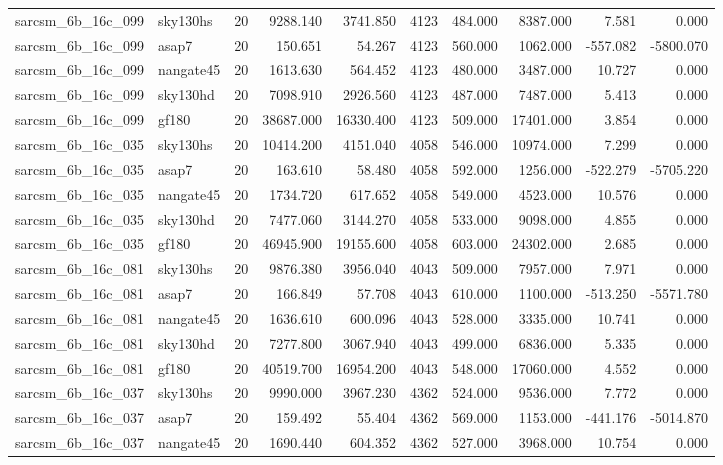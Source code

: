 \begin{longtable}{llrrrrrrrr}
sarcsm\_6b\_16c\_099 & sky130hs & 20 & 9288.140 & 3741.850 & 4123 & 484.000 & 8387.000 & 7.581 & 0.000 \\
sarcsm\_6b\_16c\_099 & asap7 & 20 & 150.651 & 54.267 & 4123 & 560.000 & 1062.000 & -557.082 & -5800.070 \\
sarcsm\_6b\_16c\_099 & nangate45 & 20 & 1613.630 & 564.452 & 4123 & 480.000 & 3487.000 & 10.727 & 0.000 \\
sarcsm\_6b\_16c\_099 & sky130hd & 20 & 7098.910 & 2926.560 & 4123 & 487.000 & 7487.000 & 5.413 & 0.000 \\
sarcsm\_6b\_16c\_099 & gf180 & 20 & 38687.000 & 16330.400 & 4123 & 509.000 & 17401.000 & 3.854 & 0.000 \\
sarcsm\_6b\_16c\_035 & sky130hs & 20 & 10414.200 & 4151.040 & 4058 & 546.000 & 10974.000 & 7.299 & 0.000 \\
sarcsm\_6b\_16c\_035 & asap7 & 20 & 163.610 & 58.480 & 4058 & 592.000 & 1256.000 & -522.279 & -5705.220 \\
sarcsm\_6b\_16c\_035 & nangate45 & 20 & 1734.720 & 617.652 & 4058 & 549.000 & 4523.000 & 10.576 & 0.000 \\
sarcsm\_6b\_16c\_035 & sky130hd & 20 & 7477.060 & 3144.270 & 4058 & 533.000 & 9098.000 & 4.855 & 0.000 \\
sarcsm\_6b\_16c\_035 & gf180 & 20 & 46945.900 & 19155.600 & 4058 & 603.000 & 24302.000 & 2.685 & 0.000 \\
sarcsm\_6b\_16c\_081 & sky130hs & 20 & 9876.380 & 3956.040 & 4043 & 509.000 & 7957.000 & 7.971 & 0.000 \\
sarcsm\_6b\_16c\_081 & asap7 & 20 & 166.849 & 57.708 & 4043 & 610.000 & 1100.000 & -513.250 & -5571.780 \\
sarcsm\_6b\_16c\_081 & nangate45 & 20 & 1636.610 & 600.096 & 4043 & 528.000 & 3335.000 & 10.741 & 0.000 \\
sarcsm\_6b\_16c\_081 & sky130hd & 20 & 7277.800 & 3067.940 & 4043 & 499.000 & 6836.000 & 5.335 & 0.000 \\
sarcsm\_6b\_16c\_081 & gf180 & 20 & 40519.700 & 16954.200 & 4043 & 548.000 & 17060.000 & 4.552 & 0.000 \\
sarcsm\_6b\_16c\_037 & sky130hs & 20 & 9990.000 & 3967.230 & 4362 & 524.000 & 9536.000 & 7.772 & 0.000 \\
sarcsm\_6b\_16c\_037 & asap7 & 20 & 159.492 & 55.404 & 4362 & 569.000 & 1153.000 & -441.176 & -5014.870 \\
sarcsm\_6b\_16c\_037 & nangate45 & 20 & 1690.440 & 604.352 & 4362 & 527.000 & 3968.000 & 10.754 & 0.000 \\

\end{longtable}
